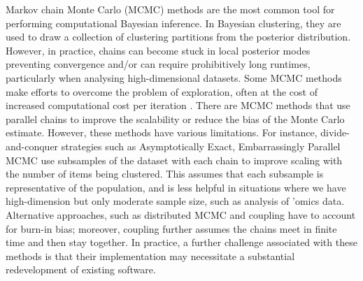 \documentclass{bmcart}
\begin{document}
Markov chain Monte Carlo (MCMC) methods are the most common tool for performing computational Bayesian inference. In Bayesian clustering, they are used to draw a collection of clustering partitions from the posterior distribution.  %
However, in practice, chains can become stuck in local posterior modes preventing convergence %
\citep[see, e.g., the Supplementary Materials of][]{strauss2020gpseudoclust} and/or can require prohibitively long runtimes, particularly when analysing high-dimensional datasets. Some MCMC methods make efforts to overcome the problem of exploration, often at the cost of increased computational cost per iteration \cite{robert2018accelerating}.  There are MCMC methods that use parallel chains to improve the scalability or reduce the bias of the Monte Carlo estimate. However, these methods have various limitations. For instance, divide-and-conquer strategies such as Asymptotically Exact, Embarrassingly Parallel MCMC \citep{NeiswangerAsymptoticallyExactEmbarrassingly2014} use subsamples of the dataset with each chain to improve scaling with the number of items being clustered. This assumes that each subsample is representative of the population, and is less helpful in situations where we have high-dimension but only moderate sample size, such as analysis of 'omics data. Alternative approaches, such as distributed MCMC \citep{MurrayDistributedMarkovchain} and coupling \citep{JacobUnbiasedMarkovchain2020} have to account for burn-in bias; moreover, coupling further assumes the chains meet in finite time and then stay together. In practice, a further challenge associated with these methods is that their implementation may necessitate a substantial redevelopment of existing software.

\end{document}
